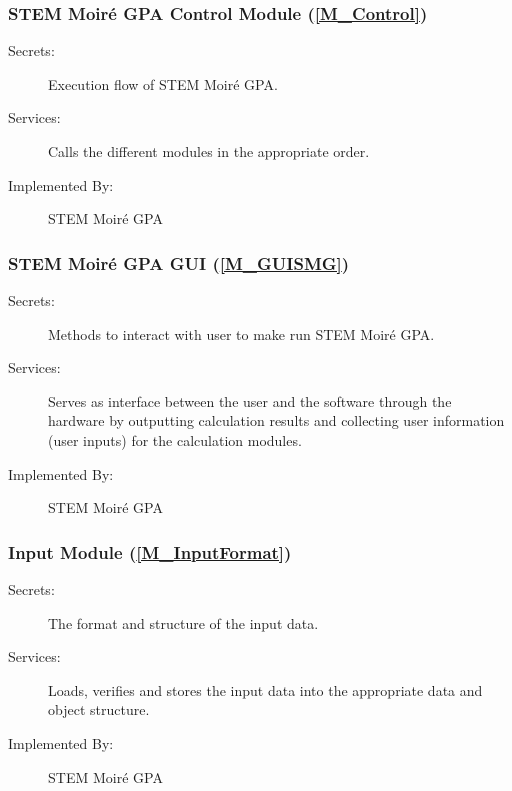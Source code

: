 \documentclass[12pt, titlepage]{article}
\newcommand{\progname}{STEM Moir{\'e} GPA}
\begin{document}

\subsubsection{\progname{} Control Module (\texorpdfstring{\cref{M_Control}}))}

\begin{description}
\item[Secrets:] Execution flow of \progname{}.
\item[Services:] Calls the different modules in the appropriate order.
\item[Implemented By:] \progname{}
\end{description}

\subsubsection{\progname{} GUI (\texorpdfstring{\cref{M_GUISMG}}))}
\begin{description}
\item[Secrets:] Methods to interact with user to make run \progname{}.
\item[Services:] Serves as interface between the user and the software through 
the hardware by outputting calculation results and collecting user information 
(user inputs) for the calculation modules.
\item[Implemented By:] \progname{}
\end{description}

\subsubsection{Input Module (\texorpdfstring{\cref{M_InputFormat}}))}

\begin{description}
\item[Secrets:] The format and structure of the input data.
\item[Services:] Loads, verifies and stores the input data into the appropriate 
data and object structure.
\item[Implemented By:] \progname{}
\end{description}
\end{document}
